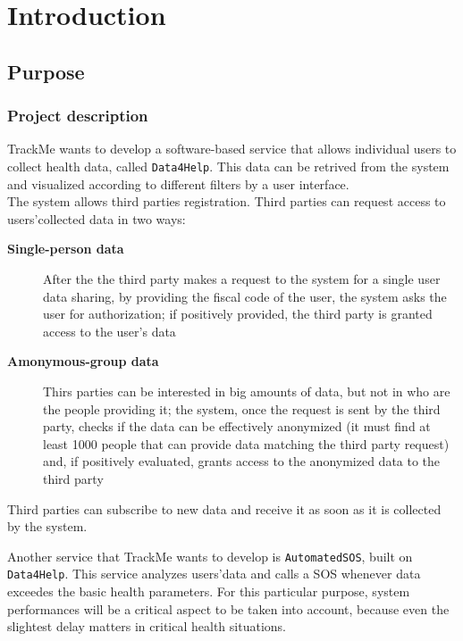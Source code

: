 \section{Introduction}
\label{sec:intro}

  \subsection{Purpose}

      \subsubsection{Project description}

        TrackMe wants to develop a software-based service that allows individual users to collect health data, called \texttt{Data4Help}. This data can be retrived from the system and visualized according to different filters by a user interface. \\
        The system allows third parties registration. Third parties can request access to users'collected data in two ways:

        \begin{description}
          \item [\textbf{Single-person data}] After the the third party makes a request to the system for a single user data sharing, by providing  the fiscal code of the user, the system asks the user for authorization; if positively provided, the third party is granted access to the user's data
          \item [\textbf{Amonymous-group data}] Thirs parties can be interested in big amounts of data, but not in who are the people providing it; the system, once the request is sent by the third party, checks if the data can be effectively anonymized (it must find at least 1000 people that can provide data matching the third party request) and, if positively evaluated, grants access to the anonymized data to the third party
        \end{description}

        Third parties can subscribe to new data and receive it as soon as it is collected by the system.

        Another service that TrackMe wants to develop is \texttt{AutomatedSOS}, built on \texttt{Data4Help}. This service analyzes users'data and calls a SOS whenever data exceedes the basic health parameters. For this particular purpose, system performances will be a critical aspect to be taken into account, because even the slightest delay matters in critical health situations.

